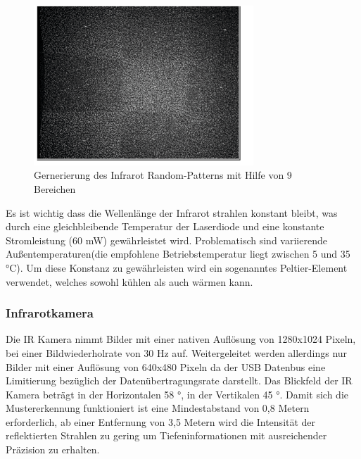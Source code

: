 \begin{figure}
  \vspace{-20pt}
  \begin{center}
        \includegraphics[height=6cm]{Res/9_Dots.png}
  \end{center}
  \vspace{-20pt}
  \caption{Gernerierung des Infrarot Random-Patterns mit Hilfe von 9 Bereichen }
  \vspace{-10pt}
\end{figure}





Es ist wichtig dass die Wellenlänge der Infrarot strahlen konstant bleibt, was durch eine gleichbleibende Temperatur der Laserdiode und eine konstante Stromleistung (60 mW) gewährleistet wird. Problematisch sind variierende Außentemperaturen(die empfohlene Betriebstemperatur  liegt zwischen 5 und 35 °C). Um diese Konstanz zu gewährleisten wird ein sogenanntes  Peltier-Element verwendet, welches sowohl kühlen als auch wärmen kann.\\

\subsubsection{Infrarotkamera}


Die IR Kamera nimmt Bilder mit einer nativen Auflösung von 1280x1024 Pixeln, bei einer Bildwiederholrate von 30 Hz auf. Weitergeleitet werden allerdings nur Bilder mit einer Auflösung von 640x480 Pixeln da der USB Datenbus eine Limitierung bezüglich der Datenübertragungsrate darstellt. Das Blickfeld der IR Kamera beträgt in der Horizontalen 58 °, in der Vertikalen 45 °. Damit sich die Mustererkennung funktioniert ist eine Mindestabstand von 0,8 Metern erforderlich, ab einer Entfernung von 3,5 Metern wird die Intensität der reflektierten Strahlen zu gering um Tiefeninformationen mit ausreichender Präzision zu erhalten.\\



